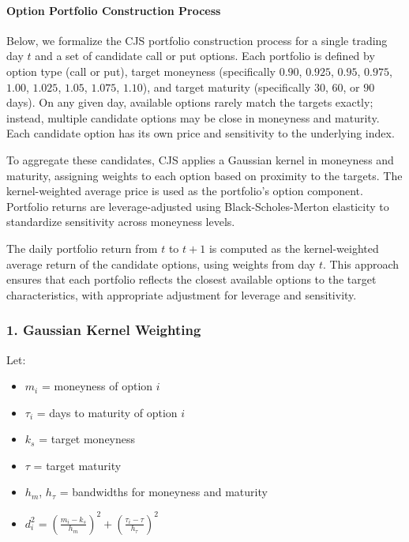 \documentclass[11pt]{article}
\begin{document}
\paragraph{Option Portfolio Construction Process}


Below, we formalize the CJS portfolio construction process for a single trading day $t$ and a set of candidate call or put options. Each portfolio is defined by option type (call or put), target moneyness (specifically $0.90$, $0.925$, $0.95$, $0.975$, $1.00$, $1.025$, $1.05$, $1.075$, $1.10$), and target maturity (specifically $30$, $60$, or $90$ days). On any given day, available options rarely match the targets exactly; instead, multiple candidate options may be close in moneyness and maturity. Each candidate option has its own price and sensitivity to the underlying index.

To aggregate these candidates, CJS applies a Gaussian kernel in moneyness and maturity, assigning weights to each option based on proximity to the targets. The kernel-weighted average price is used as the portfolio's option component. Portfolio returns are leverage-adjusted using Black-Scholes-Merton elasticity to standardize sensitivity across moneyness levels.

The daily portfolio return from $t$ to $t+1$ is computed as the kernel-weighted average return of the candidate options, using weights from day $t$. This approach ensures that each portfolio reflects the closest available options to the target characteristics, with appropriate adjustment for leverage and sensitivity.

\subsubsection{1. Gaussian Kernel Weighting}

Let:
\begin{itemize}
  \item $m_{i}$ = moneyness of option $i$
  \item $\tau_{i}$ = days to maturity of option $i$
  \item $k_{s}$ = target moneyness
  \item $\tau$ = target maturity
  \item $h_{m}$, $h_{\tau}$ = bandwidths for moneyness and maturity
  \item $d_{i}^2 = \left( \frac{m_{i} - k_{s}}{h_{m}} \right)^2 + \left( \frac{\tau_{i} - \tau}{h_{\tau}} \right)^2$
\end{itemize}
\end{document}
